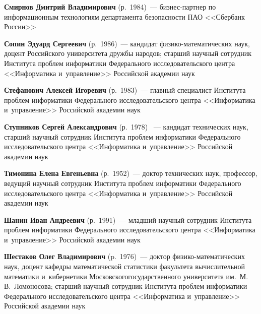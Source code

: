 \begin{multicols}{2}
\vspace*{3pt}
 
 \noindent
\textbf{Смирнов Дмитрий Владимирович} (р.\ 1984)~--- биз\-нес-парт\-нер 
по информационным технологиям департамента безопас\-ности ПАО <<Сбербанк России>>

\vspace*{3pt}
 
 \noindent
\textbf{Сопин Эдуард Сергеевич} (р.\ 1986)~--- 
кандидат фи\-зико-ма\-те\-ма\-ти\-че\-ских наук, 
доцент Российского университета друж\-бы народов; 
старший научный со\-труд\-ник Института проб\-лем информатики Федерального 
исследовательского цент\-ра <<Информатика и~управ\-ле\-ние>> Российской академии наук

\vspace*{3pt}

\noindent
\textbf{Стефанович Алексей Игоревич} (р.\ 1983)~--- главный специалист Института проб\-лем 
информатики Федерального исследовательского цент\-ра <<Информатика и~управ\-ле\-ние>>
 Российской академии наук
 
 \vspace*{3pt}

\noindent
\textbf{Ступников Сергей Александрович} (р.\ 1978) ~--- 
кандидат технических наук, старший научный со\-труд\-ник 
Института проб\-лем информатики Федерального исследовательского центра 
<<Информатика и~управ\-ле\-ние>> Российской академии наук 

\vspace*{3pt}

\noindent
\textbf{Тимонина Елена Евгеньевна} (р.\ 1952)~--- доктор технических наук,
 профессор, ведущий научный сотруд\-ник Института проб\-лем информатики 
 Федерального исследовательского центра <<Информатика и~управ\-ление>> 
 Российской академии наук
 
 \vspace*{3pt}

\noindent
\textbf{Шанин Иван Андреевич} (р.\ 1991)~--- 
 младший научный со\-труд\-ник Института проб\-лем информатики Федерального 
 исследовательского центра <<Информатика и~управ\-ле\-ние>> Российской академии наук


\vspace*{3pt}


\noindent
\textbf{Шестаков Олег Владимирович} (p.\ 1976)~--- 
доктор фи\-зи\-ко-ма\-те\-ма\-ти\-че\-ских наук, 
доцент кафедры матема\-тической статистики факультета 
вычислительной математики и~кибернетики Московского\linebreak государственного 
университета им.\ М.\,В.~Ло\-мо\-носова; старший научный со\-труд\-ник Института проб\-лем 
информатики Федерального исследовательского цент\-ра <<Информатика и~управ\-ле\-ние>>
Российской академии наук








\end{multicols}
